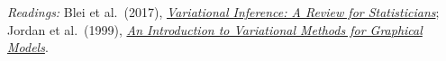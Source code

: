 \documentclass[12pt]{article}
\begin{document}
\vspace{0.05in}
{\footnotesize
\textit{Readings:} Blei et al.\ (2017), \href{https://arxiv.org/abs/1601.00670}{\emph{Variational Inference: A Review for Statisticians}};
Jordan et al.\ (1999), \href{https://www.cs.columbia.edu/~blei/fogm/readings/JordanGhahramaniJaakkolaSaul1999.pdf}{\emph{An Introduction to Variational Methods for Graphical Models}}.
\par}
\end{document}
